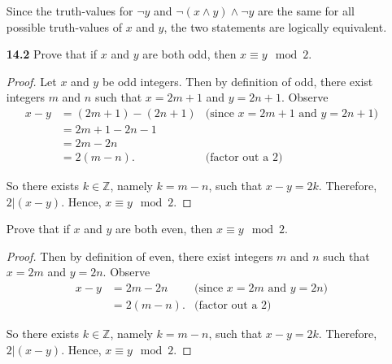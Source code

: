 \documentclass[12pt]{article}
\begin{document}
\begin{enumerate}
Since the truth-values for $\neg y$ and $\neg(x \land y) \land
\neg y$ are the same for all possible truth-values of $x$ and $y$,
the two statements are logically equivalent.


\item[{\bf \large 14.2}]
Prove that if $x$ and $y$ are both odd, then $x\equiv y \mod 2$.
\begin{proof} %
Let $x$ and $y$ be odd integers. %
Then by definition of odd, there exist integers $m$ and $n$ such that $x = 2m+1$ and $y= 2n+1$. %
Observe %
%
\begin{align*} %
x-y  &= (2m+1)- (2n+1) %
     &\mbox{(since $x=2m+1$ and $y=2n+1$)} \\ %
  &= 2m+1 -2n-1 \\
  &= 2m -2n \\
  &= 2(m-n).  %
     &\mbox{(factor out a $2$)}
\end{align*}

So there exists $k \in \mathbb{Z}$, namely $k=m-n$, such that $x-y=2k$.
Therefore, $2|(x-y)$.  %
Hence, $x\equiv y \mod 2$.

\end{proof} %


\vspace{2\baselineskip} %
Prove that if $x$ and $y$ are both even, then $x\equiv y \mod 2$.
\begin{proof}
Then by definition of even, there exist integers $m$ and $n$ such that $x = 2m$ and $y= 2n$. %
Observe %
%
\begin{align*}
x-y  &= 2m- 2n
     &\mbox{(since $x=2m$ and $y=2n$)} \\
  &= 2(m-n).
     &\mbox{(factor out a $2$)}
\end{align*}

So there exists $k \in \mathbb{Z}$, namely $k=m-n$, such that $x-y=2k$.
Therefore, $2|(x-y)$.  %
Hence, $x\equiv y \mod 2$.

\end{proof} %


\end{enumerate} %
\end{document}
